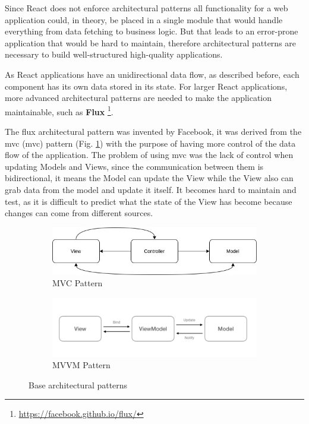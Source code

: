 Since React does not enforce architectural patterns all functionality for a web application could, in theory, be placed in a single module that would handle everything from data fetching to business logic. But that leads to an error-prone application that would be hard to maintain, therefore architectural patterns are necessary to build well-structured high-quality applications.

As React applications have an unidirectional data flow, as described before, each component has its own data stored in its state. For larger React applications, more advanced architectural patterns are needed to make the application maintainable, such as \textbf{Flux} \footnote{\url{https://facebook.github.io/flux/}}.

The flux architectural pattern was invented by Facebook, it was derived from the \acrlong{mvc} (\acrshort{mvc}) pattern (Fig. \ref{fig:mvc-pattern}) with the purpose of having more control of the data flow of the application. The problem of using \acrshort{mvc} was the lack of control when updating Models and Views, since the communication between them is bidirectional, it means the Model can update the View while the View also can grab data from the model and update it itself. It becomes hard to maintain and test, as it is difficult to predict what the state of the View has become because changes can come from different sources. 

\begin{figure}[H]
     \centering
     \begin{subfigure}[b]{0.49\textwidth}
         \centering
         \includegraphics[width=\textwidth]{Chapters/img/2_background/mvc-pattern.jpg}
         \caption{MVC Pattern}
         \label{fig:mvc-pattern}
     \end{subfigure}
     \hfill
     \begin{subfigure}[b]{0.49\textwidth}
         \centering
         \includegraphics[width=\textwidth]{Chapters/img/2_background/mvvm-pattern.png}
         \caption{MVVM Pattern~\cite{mvvm-pattern-figure}}
         \label{fig:mvvm-pattern}
     \end{subfigure}
     \caption{Base architectural patterns}
\end{figure}

